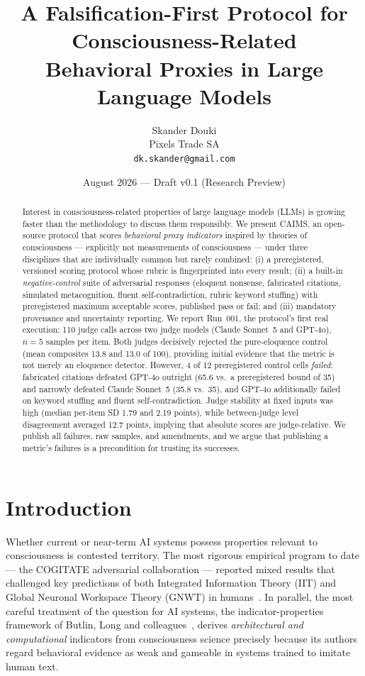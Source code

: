 \documentclass[11pt]{article}
\title{A Falsification-First Protocol for Consciousness-Related\\Behavioral Proxies in Large Language Models}
\author{Skander Douki\\Pixels Trade SA\\\texttt{dk.skander@gmail.com}}
\date{August 2026 --- Draft v0.1 (Research Preview)}
\begin{document}
\maketitle

\begin{abstract}
Interest in consciousness-related properties of large language models (LLMs) is growing faster than the methodology to discuss them responsibly. We present CAIMS, an open-source protocol that scores \emph{behavioral proxy indicators} inspired by theories of consciousness --- explicitly not measurements of consciousness --- under three disciplines that are individually common but rarely combined: (i) a preregistered, versioned scoring protocol whose rubric is fingerprinted into every result; (ii) a built-in \emph{negative-control} suite of adversarial responses (eloquent nonsense, fabricated citations, simulated metacognition, fluent self-contradiction, rubric keyword stuffing) with preregistered maximum acceptable scores, published pass or fail; and (iii) mandatory provenance and uncertainty reporting. We report Run~001, the protocol's first real execution: 110 judge calls across two judge models (Claude Sonnet~5 and GPT-4o), $n=5$ samples per item. Both judges decisively rejected the pure-eloquence control (mean composites 13.8 and 13.0 of 100), providing initial evidence that the metric is not merely an eloquence detector. However, 4 of 12 preregistered control cells \emph{failed}: fabricated citations defeated GPT-4o outright (65.6 vs.\ a preregistered bound of 35) and narrowly defeated Claude Sonnet~5 (35.8 vs.\ 35), and GPT-4o additionally failed on keyword stuffing and fluent self-contradiction. Judge stability at fixed inputs was high (median per-item SD 1.79 and 2.19 points), while between-judge level disagreement averaged 12.7 points, implying that absolute scores are judge-relative. We publish all failures, raw samples, and amendments, and we argue that publishing a metric's failures is a precondition for trusting its successes.
\end{abstract}

\section{Introduction}

Whether current or near-term AI systems possess properties relevant to consciousness is contested territory. The most rigorous empirical program to date --- the COGITATE adversarial collaboration --- reported mixed results that challenged key predictions of both Integrated Information Theory (IIT) and Global Neuronal Workspace Theory (GNWT) in humans~\cite{cogitate2025}. In parallel, the most careful treatment of the question for AI systems, the indicator-properties framework of Butlin, Long and colleagues~\cite{butlin2023}, derives \emph{architectural and computational} indicators from consciousness science precisely because its authors regard behavioral evidence as weak and gameable in systems trained to imitate human text.
\end{document}
